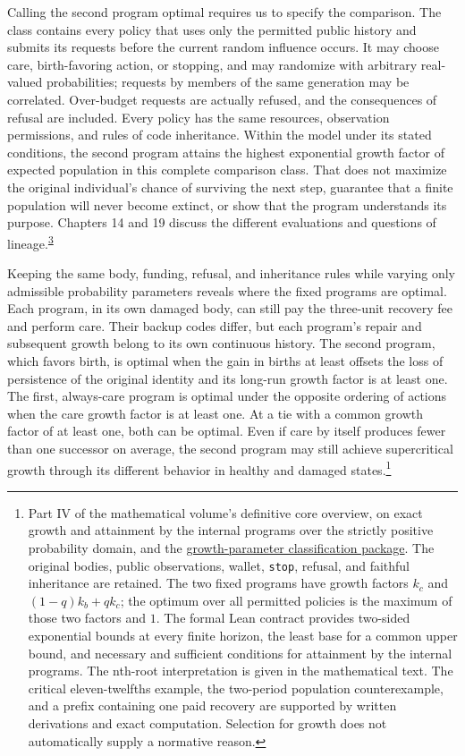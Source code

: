\documentclass[
  english,
  11pt,
  oneside]{book}
\begin{document}
Calling the second program optimal requires us to specify the comparison. The class contains every policy that uses only the permitted public history and submits its requests before the current random influence occurs. It may choose care, birth-favoring action, or stopping, and may randomize with arbitrary real-valued probabilities; requests by members of the same generation may be correlated. Over-budget requests are actually refused, and the consequences of refusal are included. Every policy has the same resources, observation permissions, and rules of code inheritance. Within the model under its stated conditions, the second program attains the highest exponential growth factor of expected population in this complete comparison class. That does not maximize the original individual's chance of surviving the next step, guarantee that a finite population will never become extinct, or show that the program understands its purpose. Chapters 14 and 19 discuss the different evaluations and questions of lineage.\textsuperscript{\hyperlink{ph-note-3}{3}}

Keeping the same body, funding, refusal, and inheritance rules while varying only admissible probability parameters reveals where the fixed programs are optimal. Each program, in its own damaged body, can still pay the three-unit recovery fee and perform care. Their backup codes differ, but each program's repair and subsequent growth belong to its own continuous history. The second program, which favors birth, is optimal when the gain in births at least offsets the loss of persistence of the original identity and its long-run growth factor is at least one. The first, always-care program is optimal under the opposite ordering of actions when the care growth factor is at least one. At a tie with a common growth factor of at least one, both can be optimal. Even if care by itself produces fewer than one successor on average, the second program may still achieve supercritical growth through its different behavior in healthy and damaged states.\footnote{\hypertarget{ph-note-19}{}Part IV of the mathematical volume's definitive core overview, on exact growth and attainment by the internal programs over the strictly positive probability domain, and the \href{https://github.com/MurphyHoops/UEOT/blob/3d443ec29eb17af1fc00699a74e2d42d73516d81/formalization/ueot-core/docs/compression/theory_completion/unified_closure/core_growth_classification_v1/README.md}{growth-parameter classification package}. The original bodies, public observations, wallet, \texttt{stop}, refusal, and faithful inheritance are retained. The two fixed programs have growth factors \(k_c\) and \((1-q)k_b+qk_c\); the optimum over all permitted policies is the maximum of those two factors and \(1\). The formal Lean contract provides two-sided exponential bounds at every finite horizon, the least base for a common upper bound, and necessary and sufficient conditions for attainment by the internal programs. The nth-root interpretation is given in the mathematical text. The critical eleven-twelfths example, the two-period population counterexample, and a prefix containing one paid recovery are supported by written derivations and exact computation. Selection for growth does not automatically supply a normative reason.}
\end{document}
